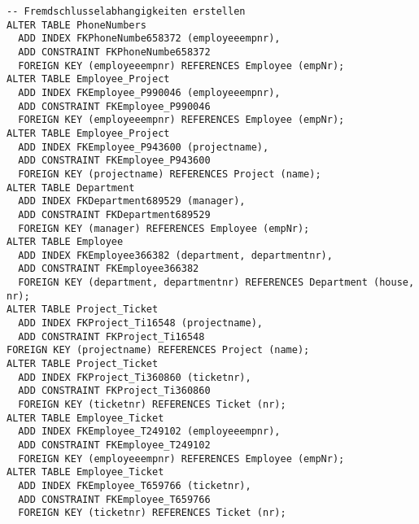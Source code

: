 \documentclass[11pt,a4paper,DIV=9]{scrartcl}
\begin{document}
\begin{lstlisting}
-- Fremdschlusselabhangigkeiten erstellen
ALTER TABLE PhoneNumbers
  ADD INDEX FKPhoneNumbe658372 (employeeempnr),
  ADD CONSTRAINT FKPhoneNumbe658372
  FOREIGN KEY (employeeempnr) REFERENCES Employee (empNr);
ALTER TABLE Employee_Project
  ADD INDEX FKEmployee_P990046 (employeeempnr),
  ADD CONSTRAINT FKEmployee_P990046
  FOREIGN KEY (employeeempnr) REFERENCES Employee (empNr);
ALTER TABLE Employee_Project
  ADD INDEX FKEmployee_P943600 (projectname),
  ADD CONSTRAINT FKEmployee_P943600
  FOREIGN KEY (projectname) REFERENCES Project (name);
ALTER TABLE Department
  ADD INDEX FKDepartment689529 (manager),
  ADD CONSTRAINT FKDepartment689529
  FOREIGN KEY (manager) REFERENCES Employee (empNr);
ALTER TABLE Employee
  ADD INDEX FKEmployee366382 (department, departmentnr),
  ADD CONSTRAINT FKEmployee366382
  FOREIGN KEY (department, departmentnr) REFERENCES Department (house, nr);
ALTER TABLE Project_Ticket
  ADD INDEX FKProject_Ti16548 (projectname),
  ADD CONSTRAINT FKProject_Ti16548
FOREIGN KEY (projectname) REFERENCES Project (name);
ALTER TABLE Project_Ticket
  ADD INDEX FKProject_Ti360860 (ticketnr),
  ADD CONSTRAINT FKProject_Ti360860
  FOREIGN KEY (ticketnr) REFERENCES Ticket (nr);
ALTER TABLE Employee_Ticket
  ADD INDEX FKEmployee_T249102 (employeeempnr),
  ADD CONSTRAINT FKEmployee_T249102
  FOREIGN KEY (employeeempnr) REFERENCES Employee (empNr);
ALTER TABLE Employee_Ticket
  ADD INDEX FKEmployee_T659766 (ticketnr),
  ADD CONSTRAINT FKEmployee_T659766
  FOREIGN KEY (ticketnr) REFERENCES Ticket (nr);
\end{lstlisting}
\end{document}
